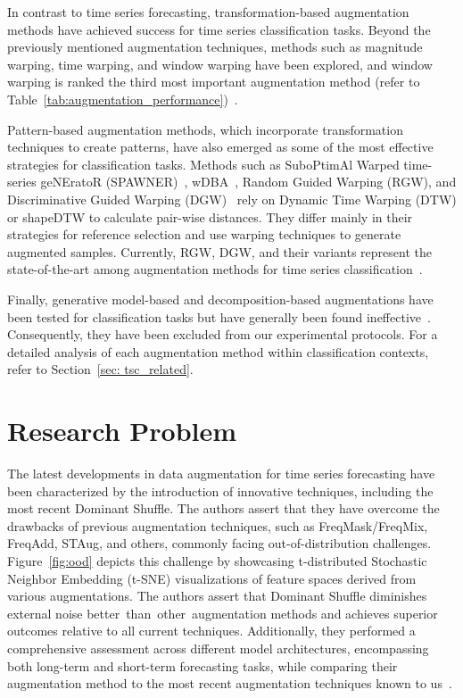 In contrast to time series forecasting, transformation-based augmentation methods have achieved success for time series classification tasks. Beyond the previously mentioned augmentation techniques, methods such as magnitude warping, time warping, and window warping have been explored, and window warping is ranked the third most important augmentation method (refer to Table~\ref{tab:augmentation_performance})~\cite{gao2024dataaugmentationtimeseriesclassification}.

Pattern-based augmentation methods, which incorporate transformation techniques to create patterns, have also emerged as some of the most effective strategies for classification tasks. Methods such as SuboPtimAl Warped time-series geNEratoR (SPAWNER)~\cite{s20010098}, wDBA~\cite{asd}, Random Guided Warping (RGW), and Discriminative Guided Warping (DGW)~\cite{iwana2020timeseriesdataaugmentation} rely on Dynamic Time Warping (DTW) or shapeDTW to calculate pair-wise distances. They differ mainly in their strategies for reference selection and use warping techniques to generate augmented samples. Currently, RGW, DGW, and their variants represent the state-of-the-art among augmentation methods for time series classification~\cite{gao2024dataaugmentationtimeseriesclassification}.

Finally, generative model-based and decomposition-based augmentations have been tested for classification tasks but have generally been found ineffective~\cite{gao2024dataaugmentationtimeseriesclassification, 10.1371/journal.pone.0254841}. Consequently, they have been excluded from our experimental protocols. For a detailed analysis of each augmentation method within classification contexts, refer to Section~\ref{sec: tsc_related}.


\section{Research Problem}
\label{sec: problem}

The latest developments in data augmentation for time series forecasting have been characterized by the introduction of innovative techniques, including the most recent Dominant Shuffle. The authors assert that they have overcome the drawbacks of previous augmentation techniques, such as FreqMask/FreqMix, FreqAdd, STAug, and others, commonly facing out-of-distribution challenges. Figure~\ref{fig:ood} depicts this challenge by showcasing t-distributed Stochastic Neighbor Embedding (t-SNE) visualizations of feature spaces derived from various augmentations. The authors assert that Dominant Shuffle diminishes external noise better than other augmentation methods and achieves superior outcomes relative to all current techniques. Additionally, they performed a comprehensive assessment across different model architectures, encompassing both long-term and short-term forecasting tasks, while comparing their augmentation method to the most recent augmentation techniques known to us~\cite{zhao2024dominantshufflesimplepowerful, freqadd, zhang2023diversecoherentaugmentationtimeseries, chen2023fraugfrequencydomainaugmentation}.

